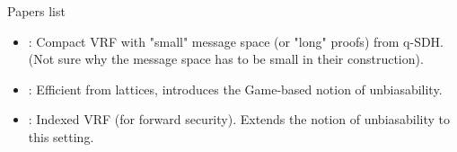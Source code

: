 Papers list
\begin{itemize}
	
	\item \cite{PKC:DodYam05}: Compact VRF with "small" message space (or "long" proofs) from q-SDH. (Not sure why the message space has to be small in their construction).

	\item \cite{EPRINT:EKSSZSC20}: Efficient from lattices, introduces the Game-based notion of unbiasability.
	
	\item \cite{EPRINT:EEKLSSYZ22}: Indexed VRF (for forward security). Extends the notion of unbiasability to this setting.	
\end{itemize}
